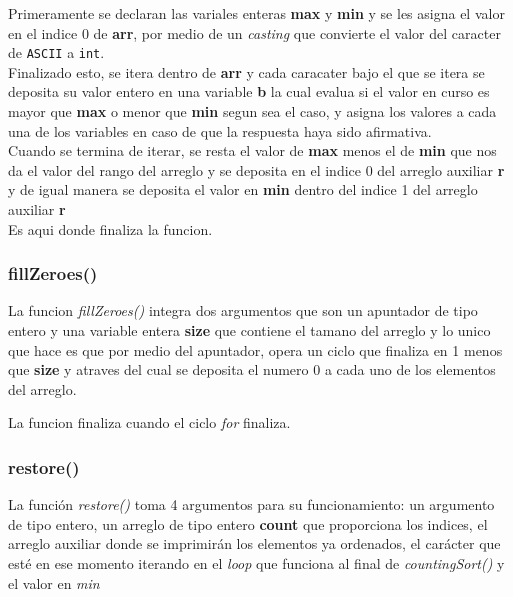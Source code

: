 \documentclass{article}
\begin{document}
				Primeramente se declaran las variales enteras \textbf{max} y \textbf{min} y se les asigna el valor en el indice 0 de \textbf{arr}, por medio de un \emph{casting} que convierte el valor del caracter de \verb|ASCII| a \verb|int|.\\
				
				Finalizado esto, se itera dentro de \textbf{arr} y cada caracater bajo el que se itera se deposita su valor entero en una variable \textbf{b} la cual evalua si el valor en curso es mayor que \textbf{max} o menor que \textbf{min} segun sea el caso, y asigna los valores a cada una de los variables en caso de que la respuesta haya sido afirmativa.\\
				
				Cuando se termina de iterar, se resta el valor de \textbf{max} menos el de \textbf{min} que nos da el valor del rango del arreglo y se deposita en el indice 0 del arreglo auxiliar \textbf{r} y de igual manera se deposita el valor en \textbf{min} dentro del indice 1 del arreglo auxiliar \textbf{r}\\
				
				Es aqui donde finaliza la funcion.
				
				 
			\subsubsection{fillZeroes()}
			
				La funcion \emph{fillZeroes()} integra dos argumentos que son un apuntador de tipo entero y una variable entera \textbf{size} que contiene el tamano del arreglo y lo unico que hace es que por medio del apuntador, opera un ciclo que finaliza en 1 menos que \textbf{size} y atraves del cual se deposita el numero 0 a cada uno de los elementos del arreglo.
				
				La funcion finaliza cuando el ciclo \emph{for} finaliza.
				
			\subsubsection{restore()}
			
				La función \emph{restore()} toma 4 argumentos para su funcionamiento: un argumento de tipo entero, un arreglo de tipo entero \textbf{count} que proporciona los indices, el arreglo auxiliar donde se imprimirán los elementos ya ordenados, el carácter que esté en ese momento iterando en el \emph{loop} que funciona al final de \emph{countingSort()} y el valor en  \emph{min} 
				
\end{document}
